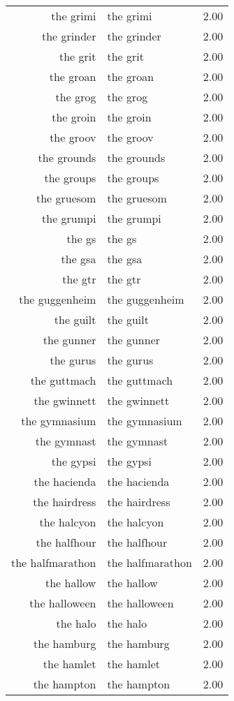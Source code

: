 \begin{table}[ht]
\begin{tabular}{rlr}
  the grimi & the grimi & 2.00 \\ 
  the grinder & the grinder & 2.00 \\ 
  the grit & the grit & 2.00 \\ 
  the groan & the groan & 2.00 \\ 
  the grog & the grog & 2.00 \\ 
  the groin & the groin & 2.00 \\ 
  the groov & the groov & 2.00 \\ 
  the grounds & the grounds & 2.00 \\ 
  the groups & the groups & 2.00 \\ 
  the gruesom & the gruesom & 2.00 \\ 
  the grumpi & the grumpi & 2.00 \\ 
  the gs & the gs & 2.00 \\ 
  the gsa & the gsa & 2.00 \\ 
  the gtr & the gtr & 2.00 \\ 
  the guggenheim & the guggenheim & 2.00 \\ 
  the guilt & the guilt & 2.00 \\ 
  the gunner & the gunner & 2.00 \\ 
  the gurus & the gurus & 2.00 \\ 
  the guttmach & the guttmach & 2.00 \\ 
  the gwinnett & the gwinnett & 2.00 \\ 
  the gymnasium & the gymnasium & 2.00 \\ 
  the gymnast & the gymnast & 2.00 \\ 
  the gypsi & the gypsi & 2.00 \\ 
  the hacienda & the hacienda & 2.00 \\ 
  the hairdress & the hairdress & 2.00 \\ 
  the halcyon & the halcyon & 2.00 \\ 
  the halfhour & the halfhour & 2.00 \\ 
  the halfmarathon & the halfmarathon & 2.00 \\ 
  the hallow & the hallow & 2.00 \\ 
  the halloween & the halloween & 2.00 \\ 
  the halo & the halo & 2.00 \\ 
  the hamburg & the hamburg & 2.00 \\ 
  the hamlet & the hamlet & 2.00 \\ 
  the hampton & the hampton & 2.00 \\ 

\end{tabular}
\end{table}
